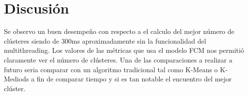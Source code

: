 \documentclass[10pt,journal]{IEEEtran}
\begin{document}
\section{Discusión}


Se observo un buen desempeño con respecto a el calculo del mejor número de clústeres siendo de 300ms aproximadamente sin la funcionalidad del multithreading. Los valores de las métricas que usa el modelo FCM nos permitió claramente ver el número de clústeres.  Una de las comparaciones a realizar a futuro seria comparar con un algoritmo tradicional tal como K-Means o K-Mediods a fin de comparar tiempo y si es tan notable el encuentro del mejor clúster.




\begin{table}[th]
\centering
\caption{Descripción de las 13 variables dentro del dataset usado en los modelos}\label{table:comparative}

\end{table}
\end{document}
